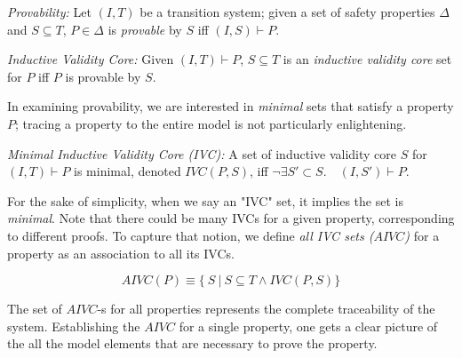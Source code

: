 \begin{definition}{\emph{Provability:}}
Let $(I, T)$ be a transition system; given a set of safety properties $\Delta$ and $S \subseteq T$, $P \in \Delta$ is \emph{provable} by $S$ iff
$(I, S) \vdash P$.
\end{definition}

\begin{definition}{\emph{Inductive Validity Core:}}
  \label{def:ivc}
  Given $(I, T)\vdash P$, $S \subseteq
  T$ is an {\em inductive validity core} set for $P$
  iff $P$ is provable by $S$.
\end{definition}

In examining provability, we are interested in {\em minimal} sets that satisfy a property $P$; tracing a property to the entire model is not particularly enlightening.

\begin{definition}{\emph{Minimal Inductive Validity Core (IVC):}}
  \label{def:minimal-ivc}
  A set of inductive validity core $S$ for $(I, T)\vdash P$ is minimal, denoted $IVC(P, S)$, iff
  $\neg\exists S' \subset S .\quad (I, S') \vdash P $.
\end{definition}

For the sake of simplicity, when we say an "IVC" set, it implies the set is \emph{minimal}.
Note that there could be many IVCs for a given property, corresponding to different proofs. To capture that notion, we define \emph{all IVC sets ($AIVC$)} for a property as an association to all its IVCs.

$$ AIVC(P) \equiv  \{\ S~|~S \subseteq T \land  IVC(P, S)\} $$

\noindent The set of $AIVC$-s for all properties represents the complete traceability of the system. Establishing the $AIVC$ for a single property, one gets a clear picture of the all the model elements that are necessary to prove the property.

